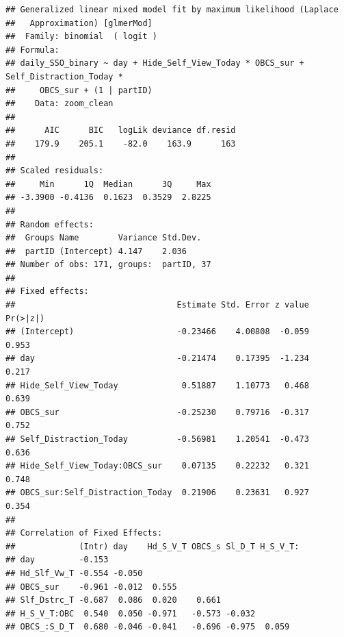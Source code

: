 \documentclass[
  english,
  man]{apa7}
\begin{document}
\begin{verbatim}
## Generalized linear mixed model fit by maximum likelihood (Laplace
##   Approximation) [glmerMod]
##  Family: binomial  ( logit )
## Formula: 
## daily_SSO_binary ~ day + Hide_Self_View_Today * OBCS_sur + Self_Distraction_Today *  
##     OBCS_sur + (1 | partID)
##    Data: zoom_clean
## 
##      AIC      BIC   logLik deviance df.resid 
##    179.9    205.1    -82.0    163.9      163 
## 
## Scaled residuals: 
##     Min      1Q  Median      3Q     Max 
## -3.3900 -0.4136  0.1623  0.3529  2.8225 
## 
## Random effects:
##  Groups Name        Variance Std.Dev.
##  partID (Intercept) 4.147    2.036   
## Number of obs: 171, groups:  partID, 37
## 
## Fixed effects:
##                                 Estimate Std. Error z value Pr(>|z|)
## (Intercept)                     -0.23466    4.00808  -0.059    0.953
## day                             -0.21474    0.17395  -1.234    0.217
## Hide_Self_View_Today             0.51887    1.10773   0.468    0.639
## OBCS_sur                        -0.25230    0.79716  -0.317    0.752
## Self_Distraction_Today          -0.56981    1.20541  -0.473    0.636
## Hide_Self_View_Today:OBCS_sur    0.07135    0.22232   0.321    0.748
## OBCS_sur:Self_Distraction_Today  0.21906    0.23631   0.927    0.354
## 
## Correlation of Fixed Effects:
##             (Intr) day    Hd_S_V_T OBCS_s Sl_D_T H_S_V_T:
## day         -0.153                                       
## Hd_Slf_Vw_T -0.554 -0.050                                
## OBCS_sur    -0.961 -0.012  0.555                         
## Slf_Dstrc_T -0.687  0.086  0.020    0.661                
## H_S_V_T:OBC  0.540  0.050 -0.971   -0.573 -0.032         
## OBCS_:S_D_T  0.680 -0.046 -0.041   -0.696 -0.975  0.059
\end{verbatim}
\end{document}
